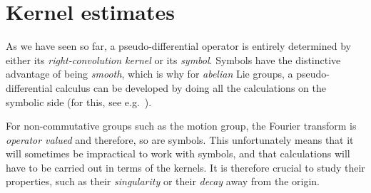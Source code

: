 
\section{Kernel estimates}

As we have seen so far,
a pseudo-differential operator is entirely determined by either its \emph{right-convolution kernel} or its \emph{symbol}.
Symbols have the distinctive advantage of being \emph{smooth},
which is why for \emph{abelian} Lie groups,
a pseudo-differential calculus can be developed by doing all the calculations on the symbolic side
(for this, see e.g.\ \cite{RuzhanskyTurunen10}).

For non-commutative groups such as the motion group,
the Fourier transform is \emph{operator valued} and therefore, so are symbols.
This unfortunately means that it will sometimes be impractical to work with symbols,
and that calculations will have to be carried out in terms of the kernels.
It is therefore crucial to study their properties,
such as their \emph{singularity} or their \emph{decay} away from the origin.

